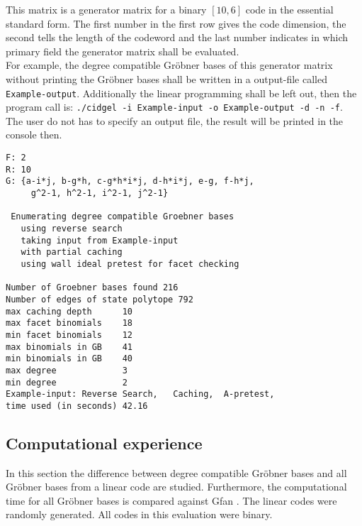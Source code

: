 This matrix is a generator matrix for a binary $[10,6]$ code in the essential standard form. 
The first number in the first row gives the code dimension, the second tells the length of the codeword and the last number indicates in which primary field the generator matrix shall be evaluated.\\

For example, the degree compatible Gröbner bases of this generator  matrix without printing the Gröbner bases shall be written in a output-file called \\ \texttt{Example-output}. Additionally the linear programming shall be left out, then the program call is: \texttt{./cidgel -i Example-input -o Example-output -d -n -f}.
The user do not has to specify an output file, the result will be printed in the console then.

\newpage

 \begin{lstlisting}[basicstyle=\fontfamily{courier}\selectfont,language={}] %
% starting GB:
F: 2
R: 10
G: {a-i*j, b-g*h, c-g*h*i*j, d-h*i*j, e-g, f-h*j,
	 g^2-1, h^2-1, i^2-1, j^2-1}

 Enumerating degree compatible Groebner bases
   using reverse search
   taking input from Example-input
   with partial caching
   using wall ideal pretest for facet checking

Number of Groebner bases found 216
Number of edges of state polytope 792
max caching depth      10
max facet binomials    18
min facet binomials    12
max binomials in GB    41
min binomials in GB    40
max degree             3
min degree             2
Example-input: Reverse Search,   Caching,  A-pretest,
time used (in seconds) 42.16
\end{lstlisting}
  
\newpage


\subsection{Computational experience}
\label{subsec:compexp} 
In this section the difference between degree compatible Gröbner bases and all Gröbner bases from a linear code are studied. Furthermore, the computational time for all Gröbner bases is compared against Gfan \cite{gfan}.
The linear codes were randomly generated. All codes in this evaluation were binary.

